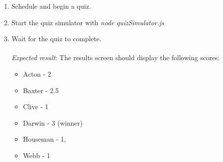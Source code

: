 \begin{enumerate}
\begin{Verbatim}[fontsize=\small]
  { house: 'webb',       year: 8,       answer: 'B',      peek: false }
  { house: 'darwin',     year: 9,       answer: 'A',      peek: false }
  { house: 'baxter',     year: 8,       answer: 'B',      peek: false }
  { house: 'clive',      year: 7,       answer: 'B',      peek: false }
  { house: 'darwin',     year: 9,       answer: 'C',      peek: true }
  { house: 'baxter',     year: 7,       answer: 'A',      peek: false }
  { house: 'acton',      year: 9,       answer: 'D',      peek: true }
  { house: 'houseman',   year: 9,       answer: 'A',      peek: true }
  { house: 'webb',       year: 11,      answer: 'D',      peek: true }
  { house: 'clive',      year: 8,       answer: 'B',      peek: false }
  { house: 'baxter',     year: 10,      answer: 'C',      peek: false }
  { house: 'houseman',   year: 8,       answer: 'C',      peek: false }
  { house: 'clive',      year: 10,      answer: 'D',      peek: false }
  { house: 'darwin',     year: 7,       answer: 'B',      peek: true }
  { house: 'baxter',     year: 7,       answer: 'D',      peek: false }
  { house: 'webb',       year: 9,       answer: 'B',      peek: true }
  { house: 'houseman',   year: 8,       answer: 'B',      peek: true }
  { house: 'webb',       year: 9,       answer: 'A',      peek: false }
  \end{Verbatim}
  \item Schedule and begin a quiz.
  \item Start the quiz simulator with \textit{node quizSimulator.js}
  \item Wait for the quiz to complete.\\\\
  \textit{Expected result}: The results screen should display the following scores:

  \begin{itemize}
    \item Acton - 2
    \item Baxter - 2.5
    \item Clive - 1
    \item Darwin - 3 (winner)
    \item Houseman - 1,
    \item Webb - 1
  \end{itemize}
\end{enumerate}

